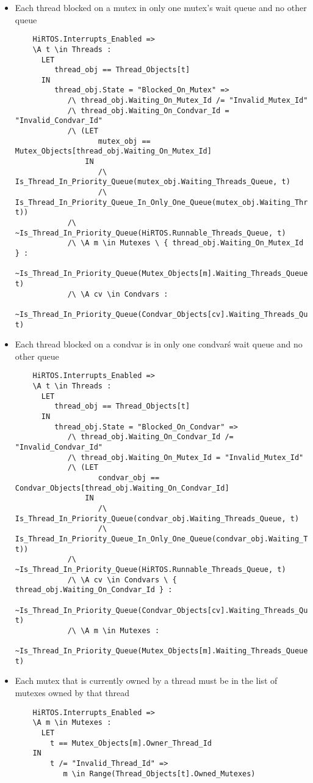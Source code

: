 \documentclass[11pt,letterpaper,twoside,openany]{book}
\begin{document}
\begin{itemize}
\item Each thread blocked on a mutex in only one mutex's wait queue and no other queue
\begin{lstlisting}
    HiRTOS.Interrupts_Enabled =>
    \A t \in Threads :
      LET
         thread_obj == Thread_Objects[t]
      IN
         thread_obj.State = "Blocked_On_Mutex" =>
            /\ thread_obj.Waiting_On_Mutex_Id /= "Invalid_Mutex_Id"
            /\ thread_obj.Waiting_On_Condvar_Id = "Invalid_Condvar_Id"
            /\ (LET
                   mutex_obj == Mutex_Objects[thread_obj.Waiting_On_Mutex_Id]
                IN
                   /\ Is_Thread_In_Priority_Queue(mutex_obj.Waiting_Threads_Queue, t)
                   /\ Is_Thread_In_Priority_Queue_In_Only_One_Queue(mutex_obj.Waiting_Threads_Queue, t))
            /\ ~Is_Thread_In_Priority_Queue(HiRTOS.Runnable_Threads_Queue, t)
            /\ \A m \in Mutexes \ { thread_obj.Waiting_On_Mutex_Id } :
                  ~Is_Thread_In_Priority_Queue(Mutex_Objects[m].Waiting_Threads_Queue, t)
            /\ \A cv \in Condvars :
                  ~Is_Thread_In_Priority_Queue(Condvar_Objects[cv].Waiting_Threads_Queue, t)
\end{lstlisting}

\item Each thread blocked on a condvar is in only one condvar\'s wait queue and no other queue
\begin{lstlisting}
    HiRTOS.Interrupts_Enabled =>
    \A t \in Threads :
      LET
         thread_obj == Thread_Objects[t]
      IN
         thread_obj.State = "Blocked_On_Condvar" =>
            /\ thread_obj.Waiting_On_Condvar_Id /= "Invalid_Condvar_Id"
            /\ thread_obj.Waiting_On_Mutex_Id = "Invalid_Mutex_Id"
            /\ (LET
                   condvar_obj == Condvar_Objects[thread_obj.Waiting_On_Condvar_Id]
                IN
                   /\ Is_Thread_In_Priority_Queue(condvar_obj.Waiting_Threads_Queue, t)
                   /\ Is_Thread_In_Priority_Queue_In_Only_One_Queue(condvar_obj.Waiting_Threads_Queue, t))
            /\ ~Is_Thread_In_Priority_Queue(HiRTOS.Runnable_Threads_Queue, t)
            /\ \A cv \in Condvars \ { thread_obj.Waiting_On_Condvar_Id } :
                  ~Is_Thread_In_Priority_Queue(Condvar_Objects[cv].Waiting_Threads_Queue, t)
            /\ \A m \in Mutexes :
                  ~Is_Thread_In_Priority_Queue(Mutex_Objects[m].Waiting_Threads_Queue, t)
\end{lstlisting}

\item Each mutex that is currently owned by a thread must be in the list of mutexes owned by that thread
\begin{lstlisting}
    HiRTOS.Interrupts_Enabled =>
    \A m \in Mutexes :
      LET
        t == Mutex_Objects[m].Owner_Thread_Id
    IN
        t /= "Invalid_Thread_Id" =>
           m \in Range(Thread_Objects[t].Owned_Mutexes)
\end{lstlisting}


\end{itemize}
\end{document}
